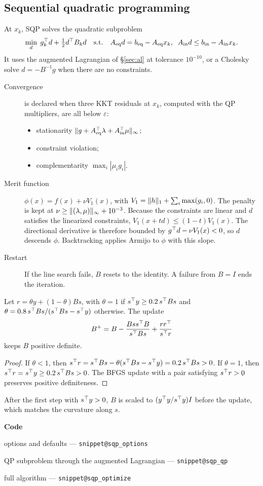 \documentclass[11pt,a4paper]{article}
\makeatletter
\newcommand{\snippetsource}[1]{\csname snippet@#1\endcsname}
\newcommand{\snippet}[3]{%
  }
\newenvironment{codepointers}{%
  \par\smallskip\begingroup\footnotesize\noindent\textcolor{blue!50!black}{\textbf{Code}}\par\nopagebreak
  \begin{list}{}{\setlength{\leftmargin}{1.2em}\setlength{\itemsep}{0pt}\setlength{\parsep}{0pt}\setlength{\topsep}{1pt}}}%
  {\end{list}\endgroup\smallskip}
\newcommand{\codeitem}[2]{\item #2 --- \texttt{\snippetsource{#1}}}
\makeatother
\begin{document}
\subsection{Sequential quadratic programming}
At $x_k$, SQP solves the quadratic subproblem
\[
  \min_d\;g_k^\top d+\tfrac12d^\top B_kd\quad\text{s.t.}\quad
  A_{\text{eq}}d=b_{\text{eq}}-A_{\text{eq}}x_k,\;\;A_{\text{in}}d\le b_{\text{in}}-A_{\text{in}}x_k .
\]
It uses the augmented Lagrangian of \S\ref{sec:al} at tolerance $10^{-10}$, or a Cholesky
solve $d=-B^{-1}g$ when there are no constraints.
\begin{description}
  \item[Convergence] is declared when three KKT residuals at $x_k$, computed with the QP
        multipliers, are all below $\varepsilon$:
        \begin{itemize}
          \item stationarity
                $\lVert g+A_{\text{eq}}^\top\lambda+A_{\text{in}}^\top\mu\rVert_\infty$;
          \item constraint violation;
          \item complementarity $\max_i|\mu_ig_i|$.
        \end{itemize}
  \item[Merit function] $\phi(x)=f(x)+\nu V_1(x)$, with
        $V_1=\lVert h\rVert_1+\sum_i\max(g_i,0)$. The penalty is kept at
        $\nu\ge\lVert (\lambda,\mu)\rVert_\infty+10^{-3}$. Because the constraints are linear and
        $d$ satisfies the linearized constraints, $V_1(x+td)\le(1-t)V_1(x)$. The
        directional derivative is therefore bounded by $g^\top d-\nu V_1(x)<0$, so $d$
        descends $\phi$. Backtracking applies Armijo to $\phi$ with this slope.
  \item[Restart] If the line search fails, $B$ resets to the identity. A failure from
        $B=I$ ends the iteration.
\end{description}

\begin{proposition}
Let $r=\theta y+(1-\theta)Bs$, with $\theta=1$ if $s^\top y\ge0.2\,s^\top Bs$ and
$\theta=0.8\,s^\top Bs/(s^\top Bs-s^\top y)$ otherwise. The update
\[
  B^+=B-\frac{Bss^\top B}{s^\top Bs}+\frac{rr^\top}{s^\top r}
\]
keeps $B$ positive definite.
\end{proposition}
\begin{proof}
If $\theta<1$, then $s^\top r=s^\top Bs-\theta(s^\top Bs-s^\top y)=0.2\,s^\top Bs>0$. If $\theta=1$,
then $s^\top r=s^\top y\ge0.2\,s^\top Bs>0$. The BFGS update with a pair satisfying $s^\top r>0$
preserves positive definiteness.
\end{proof}
After the first step with $s^\top y>0$, $B$ is scaled to $(y^\top y/s^\top y)I$ before the update,
which matches the curvature along $s$.
\snippet{sqp_bfgs}{C++}{Damped BFGS update}
\snippet{sqp_merit}{C++}{$\ell_1$ merit penalty and line search}
\begin{codepointers}
  \codeitem{sqp_options}{options and defaults}
  \codeitem{sqp_qp}{QP subproblem through the augmented Lagrangian}
  \codeitem{sqp_optimize}{full algorithm}
\end{codepointers}
\end{document}
